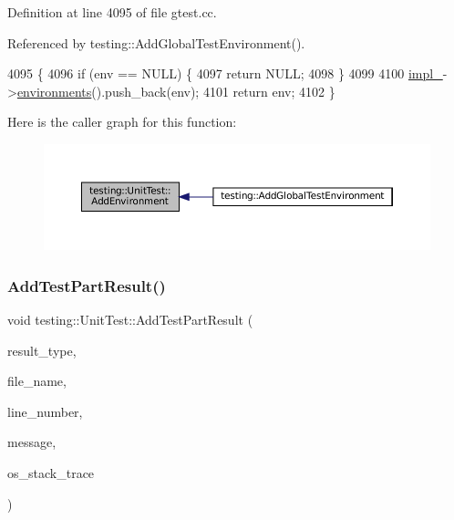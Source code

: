 Definition at line 4095 of file gtest.\+cc.



Referenced by testing\+::\+Add\+Global\+Test\+Environment().


\begin{DoxyCode}
4095                                                       \{
4096   \textcolor{keywordflow}{if} (env == NULL) \{
4097     \textcolor{keywordflow}{return} NULL;
4098   \}
4099 
4100   \hyperlink{classtesting_1_1UnitTest_a834685f92009d21b21a7307f4cbfb6e5}{impl\_}->\hyperlink{classtesting_1_1internal_1_1UnitTestImpl_aa1489e6a2378d64d68bc01963ea5db4a}{environments}().push\_back(env);
4101   \textcolor{keywordflow}{return} env;
4102 \}
\end{DoxyCode}
Here is the caller graph for this function\+:
\nopagebreak
\begin{figure}[H]
\begin{center}
\leavevmode
\includegraphics[width=350pt]{classtesting_1_1UnitTest_a1eb8e999b8696889bf1c64b4f0161203_icgraph}
\end{center}
\end{figure}
\mbox{\label{classtesting_1_1UnitTest_a1d157d2e9a5c1d3405333410c6b13932}} 
\subsubsection{\texorpdfstring{Add\+Test\+Part\+Result()}{AddTestPartResult()}}
{\footnotesize\ttfamily void testing\+::\+Unit\+Test\+::\+Add\+Test\+Part\+Result (\begin{DoxyParamCaption}\item[{\hyperlink{classtesting_1_1TestPartResult_a65ae656b33fdfdfffaf34858778a52d5}{Test\+Part\+Result\+::\+Type}}]{result\+\_\+type,  }\item[{const char $\ast$}]{file\+\_\+name,  }\item[{int}]{line\+\_\+number,  }\item[{const std\+::string \&}]{message,  }\item[{const std\+::string \&}]{os\+\_\+stack\+\_\+trace }\end{DoxyParamCaption})\hspace{0.3cm}{\ttfamily [private]}}



